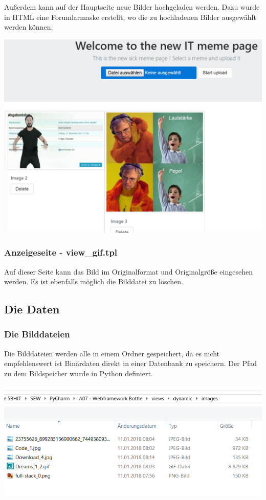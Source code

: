 Außerdem kann auf der Hauptseite neue Bilder hochgeladen werden. Dazu wurde in HTML eine Forumlarmaske erstellt, wo die zu hochladenen Bilder ausgewählt werden können.

\begin{center}
	\includegraphics[width=1.0\linewidth]{images/a1.png}
\end{center}

\subsubsection{Anzeigeseite - view\_gif.tpl}
Auf dieser Seite kann das Bild im Originalformat und Originalgröße eingesehen werden. Es ist ebenfalls möglich die Bilddatei zu löschen.


\subsection{Die Daten}

\subsubsection{Die Bilddateien}
Die Bilddateien werden alle in einem Ordner gespeichert, da es nicht empfehlenswert ist Binärdaten direkt in einer Datenbank zu speichern. Der Pfad zu dem Bildspeicher wurde in Python definiert.

\begin{center}
	\includegraphics[width=1.0\linewidth]{images/a3.png}
\end{center}


